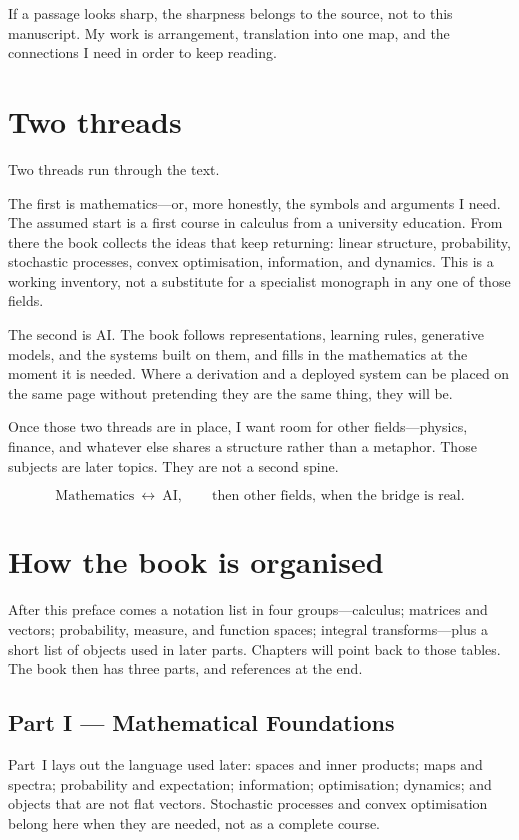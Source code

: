 If a passage looks sharp, the sharpness belongs to the source, not to this manuscript. My work is arrangement, translation into one map, and the connections I need in order to keep reading.

\section*{Two threads}

Two threads run through the text.

The first is mathematics---or, more honestly, the symbols and arguments I need. The assumed start is a first course in calculus from a university education. From there the book collects the ideas that keep returning: linear structure, probability, stochastic processes, convex optimisation, information, and dynamics. This is a working inventory, not a substitute for a specialist monograph in any one of those fields.

The second is AI. The book follows representations, learning rules, generative models, and the systems built on them, and fills in the mathematics at the moment it is needed. Where a derivation and a deployed system can be placed on the same page without pretending they are the same thing, they will be.

Once those two threads are in place, I want room for other fields---physics, finance, and whatever else shares a structure rather than a metaphor. Those subjects are later topics. They are not a second spine.

\[
\text{Mathematics}\ \leftrightarrow\ \text{AI},
\qquad
\text{then other fields, when the bridge is real}.
\]

\section*{How the book is organised}

After this preface comes a notation list in four groups---calculus; matrices and vectors; probability, measure, and function spaces; integral transforms---plus a short list of objects used in later parts. Chapters will point back to those tables. The book then has three parts, and references at the end.

\subsection*{Part I --- Mathematical Foundations}

Part~I lays out the language used later: spaces and inner products; maps and spectra; probability and expectation; information; optimisation; dynamics; and objects that are not flat vectors. Stochastic processes and convex optimisation belong here when they are needed, not as a complete course.


